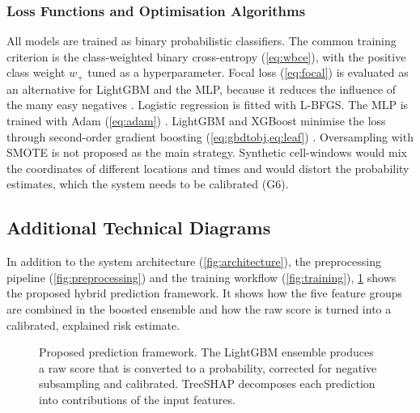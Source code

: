 \subsubsection{Loss Functions and Optimisation Algorithms}
\label{sec:loss}

All models are trained as binary probabilistic classifiers. The common training criterion is the class-weighted binary cross-entropy (\cref{eq:wbce}), with the positive class weight $w_{+}$ tuned as a hyperparameter. Focal loss (\cref{eq:focal}) is evaluated as an alternative for LightGBM and the MLP, because it reduces the influence of the many easy negatives \cite{lin2017focal}. Logistic regression is fitted with L-BFGS. The MLP is trained with Adam (\cref{eq:adam}) \cite{kingma2015adam}. LightGBM and XGBoost minimise the loss through second-order gradient boosting (\cref{eq:gbdtobj,eq:leaf}) \cite{friedman2001greedy,chen2016xgboost}. Oversampling with SMOTE \cite{chawla2002smote} is not proposed as the main strategy. Synthetic cell-windows would mix the coordinates of different locations and times and would distort the probability estimates, which the system needs to be calibrated (G6).

\subsection{Additional Technical Diagrams}
\label{sec:diagrams}

In addition to the system architecture (\cref{fig:architecture}), the preprocessing pipeline (\cref{fig:preprocessing}) and the training workflow (\cref{fig:training}), \cref{fig:model} shows the proposed hybrid prediction framework. It shows how the five feature groups are combined in the boosted ensemble and how the raw score is turned into a calibrated, explained risk estimate.

\begin{figure}[t]
\centering

\caption{Proposed prediction framework. The LightGBM ensemble produces a raw score that is converted to a probability, corrected for negative subsampling and calibrated. TreeSHAP decomposes each prediction into contributions of the input features.}
\label{fig:model}
\end{figure}

